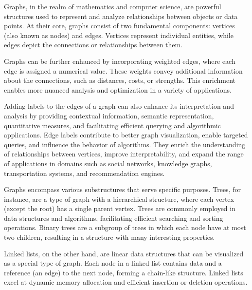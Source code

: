 Graphs, in the realm of mathematics and computer science, are powerful structures used to represent and analyze relationships between objects or data points.
At their core, graphs consist of two fundamental components: vertices (also known as nodes) and edges.
Vertices represent individual entities, while edges depict the connections or relationships between them.

Graphs can be further enhanced by incorporating weighted edges, where each edge is assigned a numerical value.
These weights convey additional information about the connections, such as distances, costs, or strengths.
This enrichment enables more nuanced analysis and optimization in a variety of applications.

Adding labels to the edges of a graph can also enhance its interpretation and analysis by providing contextual information, semantic representation, quantitative measures, and facilitating efficient querying and algorithmic applications.
Edge labels contribute to better graph visualization, enable targeted queries, and influence the behavior of algorithms.
They enrich the understanding of relationships between vertices, improve interpretability, and expand the range of applications in domains such as social networks, knowledge graphs, transportation systems, and recommendation engines.

Graphs encompass various substructures that serve specific purposes.
Trees, for instance, are a type of graph with a hierarchical structure, where each vertex (except the root) has a single parent vertex.
Trees are commonly employed in data structures and algorithms, facilitating efficient searching and sorting operations.
Binary trees are a subgroup of trees in which each node have at most two children, resulting in a structure with many interesting properties.

Linked lists, on the other hand, are linear data structures that can be visualized as a special type of graph.
Each node in a linked list contains data and a reference (an edge) to the next node, forming a chain-like structure.
Linked lists excel at dynamic memory allocation and efficient insertion or deletion operations.
